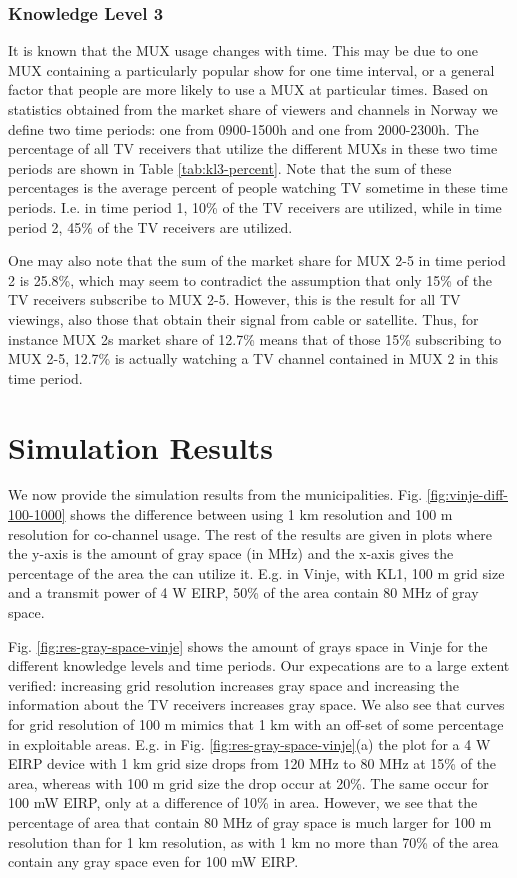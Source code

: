 \documentclass[journal,11pt,draftclsnofoot,onecolumn]{IEEEtran}
\begin{document}
\subsubsection{Knowledge Level 3}
It is known that the MUX usage changes with time. This may be due to one MUX containing a particularly popular show for one time interval, or a general factor that people are more likely to use a MUX at particular times. Based on statistics obtained from the market share of viewers and channels in Norway \cite{mediaNorge} we define two time periods: one from 0900-1500h and one from 2000-2300h. The percentage of all TV receivers that utilize the different MUXs in these two time periods are shown in Table \ref{tab:kl3-percent}. Note that the sum of these percentages is the average percent of people watching TV sometime in these time periods. I.e. in time period 1, 10\% of the TV receivers are utilized, while in time period 2, 45\% of the TV receivers are utilized.

One may also note that the sum of the market share for MUX 2-5 in time period 2 is 25.8\%, which may seem to contradict the assumption that only 15\% of the TV receivers subscribe to MUX 2-5. However, this is the result for all TV viewings, also those that obtain their signal from cable or satellite. Thus, for instance MUX 2s market share of 12.7\% means that of those 15\% subscribing to MUX 2-5, 12.7\% is actually watching a TV channel contained in MUX 2 in this time period.

\section{Simulation Results}
\label{sec:sim-res}
We now provide the simulation results from the municipalities. Fig. \ref{fig:vinje-diff-100-1000} shows the difference between using 1 km resolution and 100 m resolution for co-channel usage. The rest of the results are given in plots where the y-axis is the amount of gray space (in MHz) and the x-axis gives the percentage of the area the can utilize it. E.g. in Vinje, with KL1, 100 m grid size and a transmit power of 4 W EIRP, 50\% of the area contain 80 MHz of gray space.

Fig. \ref{fig:res-gray-space-vinje} shows the amount of grays space in Vinje for the different knowledge levels and time periods. Our expecations are to a large extent verified: increasing grid resolution increases gray space and increasing the information about the TV receivers increases gray space. We also see that curves for grid resolution of 100 m mimics that 1 km with an off-set of some percentage in exploitable areas. E.g. in Fig. \ref{fig:res-gray-space-vinje}(a) the plot for a 4 W EIRP device with 1 km grid size drops from 120 MHz to 80 MHz at 15\% of the area, whereas with 100 m grid size the drop occur at 20\%. The same occur for 100 mW EIRP, only at a difference of 10\% in area. However, we see that the percentage of area that contain 80 MHz of gray space is much larger for 100 m resolution than for 1 km resolution, as with 1 km no more than 70\% of the area contain any gray space even for 100 mW EIRP.
\end{document}
